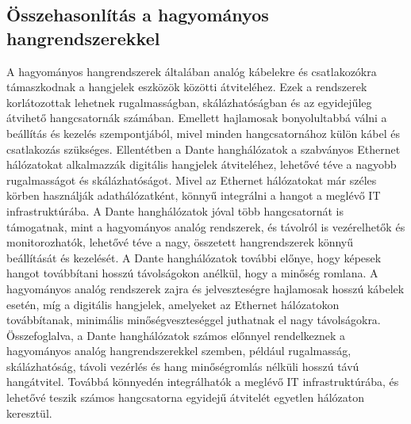 \subsection{Összehasonlítás a hagyományos hangrendszerekkel}
A hagyományos hangrendszerek általában analóg kábelekre és csatlakozókra
támaszkodnak a hangjelek eszközök közötti átviteléhez. Ezek a rendszerek
korlátozottak lehetnek rugalmasságban, skálázhatóságban és az egyidejűleg
átvihető hangcsatornák számában. Emellett hajlamosak bonyolultabbá válni a
beállítás és kezelés szempontjából, mivel minden hangcsatornához külön kábel és
csatlakozás szükséges. Ellentétben a Dante hanghálózatok a szabványos Ethernet
hálózatokat alkalmazzák digitális hangjelek átviteléhez, lehetővé téve a nagyobb
rugalmasságot és skálázhatóságot. Mivel az Ethernet hálózatokat már széles
körben használják adathálózatként, könnyű integrálni a hangot a meglévő IT
infrastruktúrába. A Dante hanghálózatok jóval több hangcsatornát is támogatnak,
mint a hagyományos analóg rendszerek, és távolról is vezérelhetők és
monitorozhatók, lehetővé téve a nagy, összetett hangrendszerek könnyű
beállítását és kezelését. A Dante hanghálózatok további előnye, hogy képesek
hangot továbbítani hosszú távolságokon anélkül, hogy a minőség romlana. A
hagyományos analóg rendszerek zajra és jelveszteségre hajlamosak hosszú kábelek
esetén, míg a digitális hangjelek, amelyeket az Ethernet hálózatokon
továbbítanak, minimális minőségveszteséggel juthatnak el nagy távolságokra.
Összefoglalva, a Dante hanghálózatok számos előnnyel rendelkeznek a hagyományos
analóg hangrendszerekkel szemben, például rugalmasság, skálázhatóság, távoli
vezérlés és hang minőségromlás nélküli hosszú távú hangátvitel. Továbbá
könnyedén integrálhatók a meglévő IT infrastruktúrába, és lehetővé teszik számos
hangcsatorna egyidejű átvitelét egyetlen hálózaton keresztül.
